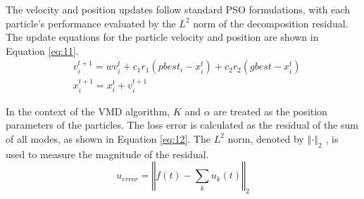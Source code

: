 \documentclass[3p,authoryear,preprint,12pt]{elsarticle}
\begin{document}
%
%
The velocity and position updates follow standard PSO formulations, with each particle's performance evaluated by the $L^2$ norm of the decomposition residual. The update equations for the particle velocity and position are shown in Equation \ref{eq:11}.
\begin{equation}
	\label{eq:11}
	\begin{split}
			& v_{i}^{t+1} = w v_{i}^t + c_1 r_1 (pbest_{i} - x_{i}^t) + c_2 r_2 (gbest - x_{i}^t) \\
			& x_{i}^{t+1} = x_i^t + v_i^{t+1}
		\end{split}
\end{equation}

In the context of the VMD algorithm, $K$  and $\alpha$  are treated as the position parameters of the particles. The loss error is calculated as the residual of the sum of all modes, as shown in Equation \ref{eq:12}. The  $L^2$ norm, denoted by $\left\Vert\cdot\right\Vert_2$ , is used to measure the magnitude of the residual.
\begin{equation}
	\label{eq:12}
	\displaystyle
	u_{error} = \left\Vert f(t) - \sum_k u_k(t) \right\Vert_2
\end{equation}
\end{document}
